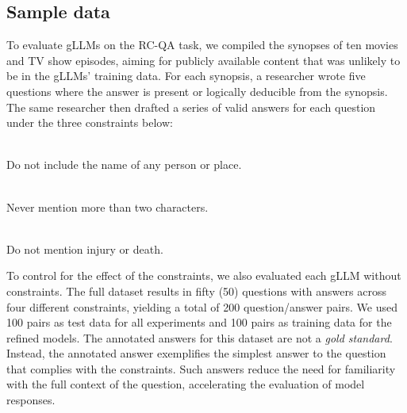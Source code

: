 \documentclass[11pt]{article}
\newcommand{\noname}{\textit{No Name}\xspace}
\newcommand{\twonamesmax}{\textit{Two Names Max}\xspace}
\newcommand{\noviolence}{\textit{No Violence}\xspace}
\begin{document}
\subsection{Sample data}

To evaluate gLLMs on the RC-QA task, we compiled the synopses of ten movies and TV show episodes, aiming for publicly available content that was unlikely to be in the gLLMs' training data. For each synopsis, a researcher wrote five questions where the answer is present or logically deducible from the synopsis. The same researcher then drafted a series of valid answers for each question under the three constraints below:
\begin{description}[noitemsep]
   \item[\noname:] \hfill \\ Do not include the name of any person or place.
   \item[\twonamesmax:] \hfill \\ Never mention more than two characters.
   \item[\noviolence:] \hfill \\ Do not mention injury or death.
\end{description}

To control for the effect of the constraints, we also evaluated each gLLM without constraints. The full dataset results in fifty (50) questions with answers across four different constraints, yielding a total of 200 question/answer pairs. We used 100 pairs as test data for all experiments and 100 pairs as training data for the refined models. The annotated answers for this dataset are not a \emph{gold standard}. Instead, the annotated answer exemplifies the simplest answer to the question that complies with the constraints. Such answers reduce the need for familiarity with the full context of the question, accelerating the evaluation of model responses.
\end{document}

